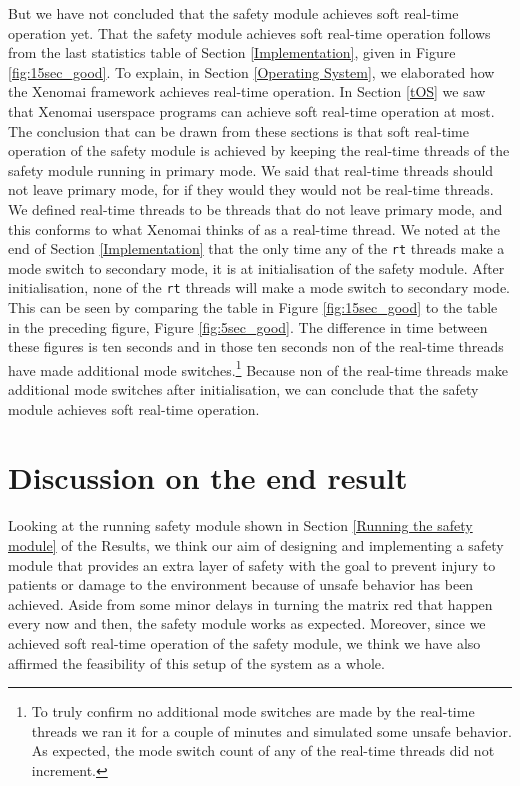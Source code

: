 \documentclass[12pt]{scrreprt}
\begin{document}
But we have not concluded that the safety module achieves soft real-time operation yet. That the safety module achieves soft real-time operation follows from the last statistics table of Section \ref{Implementation}, given in Figure \ref{fig:15sec_good}. To explain, in Section \ref{Operating System}, we elaborated how the Xenomai framework achieves real-time operation. In Section \ref{tOS} we saw that Xenomai userspace programs can achieve soft real-time operation at most. The conclusion that can be drawn from these sections is that soft real-time operation of the safety module is achieved by keeping the real-time threads of the safety module running in primary mode. We said that real-time threads should not leave primary mode, for if they would they would not be real-time threads. We defined real-time threads to be threads that do not leave primary mode, and this conforms to what Xenomai thinks of as a real-time thread. We noted at the end of Section \ref{Implementation} that the only time any of the \texttt{rt} threads make a mode switch to secondary mode, it is at initialisation of the safety module. After initialisation, none of the \texttt{rt} threads will make a mode switch to secondary mode. This can be seen by comparing the table in Figure \ref{fig:15sec_good} to the table in the preceding figure, Figure \ref{fig:5sec_good}. The difference in time between these figures is ten seconds and in those ten seconds non of the real-time threads have made additional mode switches.\footnote{To truly confirm no additional mode switches are made by the real-time threads we ran it for a couple of minutes and simulated some unsafe behavior. As expected, the mode switch count of any of the real-time threads did not increment.} Because non of the real-time threads make additional mode switches after initialisation, we can conclude that the safety module achieves soft real-time operation.

\section{Discussion on the end result}
Looking at the running safety module shown in Section \ref{Running the safety module} of the Results, we think our aim of designing and implementing a safety module that provides an extra layer of safety with the goal to prevent injury to patients or damage to the environment because of unsafe behavior has been achieved. Aside from some minor delays in turning the matrix red that happen every now and then, the safety module works as expected. Moreover, since we achieved soft real-time operation of the safety module, we think we have also affirmed the feasibility of this setup of the system as a whole.
\end{document}

